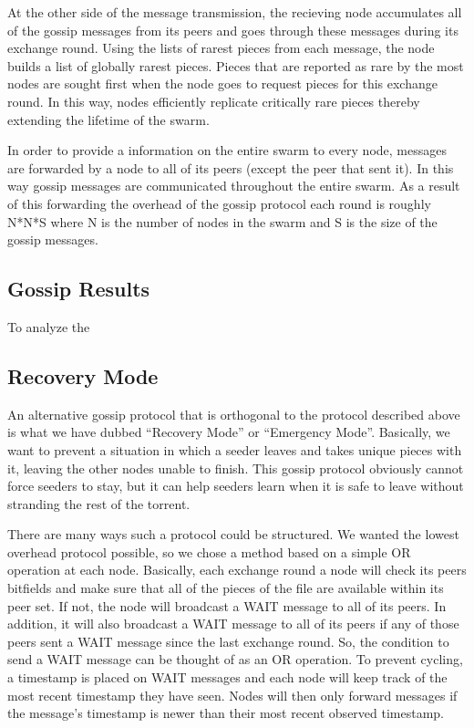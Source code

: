 At the other side of the message transmission, the recieving node
accumulates all of the gossip messages from its peers and goes
through these messages during its exchange round. Using the lists of
rarest pieces from each message, the node builds a list of globally
rarest pieces. Pieces that are reported as rare by the most nodes are
sought first when the node goes to request pieces for this exchange
round. In this way, nodes efficiently replicate critically rare pieces
thereby extending the lifetime of the swarm. 

In order to provide a information on the entire swarm to every node,
messages are forwarded by a node to all of its peers (except the peer
that sent it). In this way gossip messages are communicated throughout
the entire swarm. As a result of this forwarding the overhead of the
gossip protocol each round is roughly N*N*S where N is the number of
nodes in the swarm and S is the size of the gossip messages.

\subsection{Gossip Results}

To analyze the 

\subsection{Recovery Mode}

An alternative gossip protocol that is orthogonal to the protocol described above is 
what we have dubbed ``Recovery Mode'' or ``Emergency Mode''. Basically, we
want to prevent a situation in which a seeder leaves and takes unique pieces
with it, leaving the other nodes unable to finish. This gossip protocol obviously
cannot force seeders to stay, but it can help seeders learn when it is safe to
leave without stranding the rest of the torrent. 

There are many ways such a protocol could be structured. We wanted the lowest
overhead protocol possible, so we chose a method based on a simple OR operation
at each node. Basically, each exchange round a node will check its peers bitfields
and make sure that all of the pieces of the file are available within its peer
set. If not, the node will broadcast a WAIT message to all of its peers. In addition, it will
also broadcast a WAIT message to all of its peers if any of those peers sent a 
WAIT message since the last exchange round. So, the condition to send a WAIT message 
can be thought of as an OR operation. To prevent cycling, a timestamp is placed
on WAIT messages and each node will keep track of the most recent timestamp they have seen. 
Nodes will then only forward messages if the message's timestamp is newer than their most 
recent observed timestamp.

